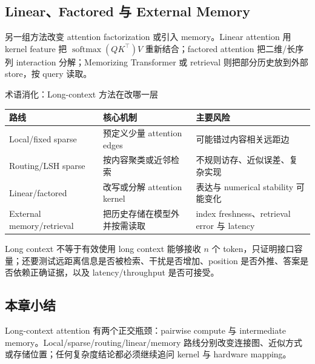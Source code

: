
\subsection{Linear、Factored 与 External Memory}

另一组方法改变 attention factorization 或引入 memory。Linear attention 用 kernel feature 把 $\operatorname{softmax}(QK^\top)V$ 重新结合；factored attention 把二维/长序列 interaction 分解；Memorizing Transformer 或 retrieval 则把部分历史放到外部 store，按 query 读取。


\begin{knowledgebox}{术语消化：Long-context 方法在改哪一层}
\begin{tabularx}{\textwidth}{@{}L{0.22\textwidth}X X@{}}
\toprule
路线 & 核心机制 & 主要风险 \\
\midrule
Local/fixed sparse & 预定义少量 attention edges & 可能错过内容相关远距边 \\
Routing/LSH sparse & 按内容聚类或近邻检索 & 不规则访存、近似误差、复杂实现 \\
Linear/factored & 改写或分解 attention kernel & 表达与 numerical stability 可能变化 \\
External memory/retrieval & 把历史存储在模型外并按需读取 & index freshness、retrieval error 与 latency \\
\bottomrule
\end{tabularx}
\end{knowledgebox}

\begin{importantbox}{Long context 不等于有效使用 long context}
能够接收 $n$ 个 token，只证明接口容量；还要测试远距离信息是否被检索、干扰是否增加、position 是否外推、答案是否依赖正确证据，以及 latency/throughput 是否可接受。
\end{importantbox}

\subsection{本章小结}

Long-context attention 有两个正交瓶颈：pairwise compute 与 intermediate memory。Local/sparse/routing/linear/memory 路线分别改变连接图、近似方式或存储位置；任何复杂度结论都必须继续追问 kernel 与 hardware mapping。

